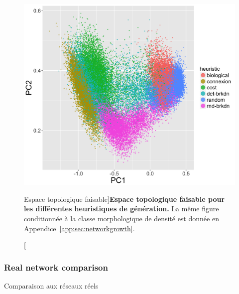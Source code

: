 \begin{figure}
\includegraphics[width=\linewidth]{Figures/NetworkGrowth/feasible_space_pca}
\caption[][Espace topologique faisable]{}{\textbf{Espace topologique faisable pour les différentes heuristiques de génération.} La même figure conditionnée à la classe morphologique de densité est donnée en Appendice~\ref{app:sec:networkgrowth}.\label{fig:networkgrowth:feasiblespace}}
\end{figure}

%



\subsubsection{Real network comparison}{Comparaison aux réseaux réels}


